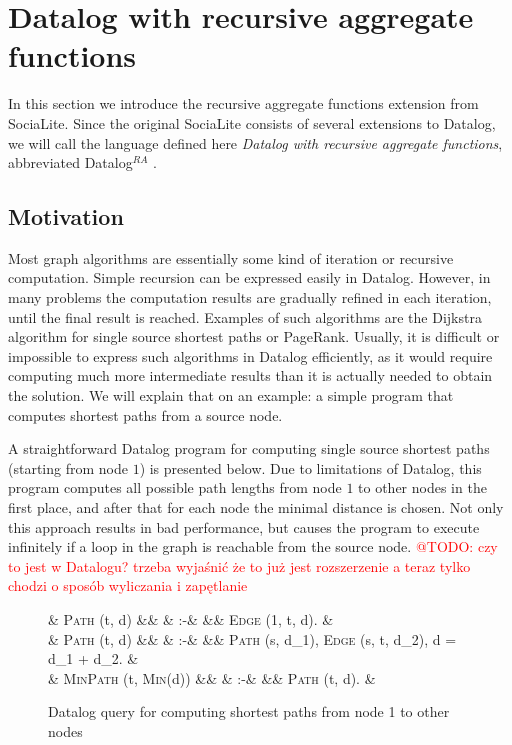 \documentclass{pracamgr}
\makeatletter
\theoremstyle{plain}
\theoremstyle{definition}
\theoremstyle{remark}
\newcommand{\todo}[1]{\textcolor{red}{@TODO: #1}}
\newcommand{\datalogra}{Datalog$^{RA}$ }
\newcommand{\assign}{:-}
\newcommand{\narrow}[1]{\begin{changemargin}{2cm}{2cm} #1 \end{changemargin}}
\newcommand{\dprog}[4]{
  \begin{figure}[h!]
    \narrow{
      #1
      \begin{flalign*}
      #2
      \end{flalign*}
      \caption{#3}
      \label{#4}
    }
\end{figure}

}
\makeatother
\begin{document}
\section{Datalog with recursive aggregate functions}\label{s:recaggr}

In this section we introduce the recursive aggregate functions extension from SociaLite. Since the original SociaLite consists of several extensions to Datalog, we will call the language defined here \emph{Datalog with recursive aggregate functions}, abbreviated \datalogra.

\subsection{Motivation}
Most graph algorithms are essentially some kind of iteration or recursive computation. Simple recursion can be expressed easily in Datalog. However, in many problems the computation results are gradually refined in each iteration, until the final result is reached. Examples of such algorithms are the Dijkstra algorithm for single source shortest paths or PageRank. Usually, it is difficult or impossible to express such algorithms in Datalog efficiently, as it would require computing much more intermediate results than it is actually needed to obtain the solution. We will explain that on an example: a simple program that computes shortest paths from a source node.

A straightforward Datalog program for computing single source shortest paths (starting from node $1$) is presented below. Due to limitations of Datalog, this program computes all possible path lengths from node $1$ to other nodes in the first place, and after that for each node the minimal distance is chosen. Not only this approach results in bad performance, but causes the program to execute infinitely if a loop in the graph is reachable from the source node. \todo{czy to jest w Datalogu?
trzeba wyjaśnić że to już jest rozszerzenie a teraz tylko chodzi o sposób wyliczania i zapętlanie}

\dprog{}{
  & \textsc{Path} (t, d) &&  & \assign & && \textsc{Edge} (1, t, d). & \\
  & \textsc{Path} (t, d) &&  & \assign & && \textsc{Path} (s, d_1), \textsc{Edge} (s, t, d_2), d = d_1 + d_2. & \\
  & \textsc{MinPath} (t, \textsc{Min}(d)) &&  & \assign & && \textsc{Path} (t, d). &
}{Datalog query for computing shortest paths from node 1 to other nodes}{ex:ssspdatalog}
\end{document}
